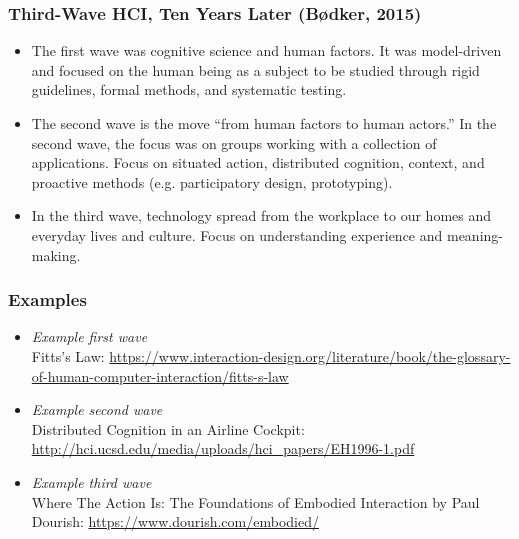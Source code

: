 \documentclass[screen, aspectratio=169]{beamer}
\begin{document}
%
\begin{frame}
\frametitle{Third-Wave HCI, Ten Years Later (B{\o}dker, 2015)}
{\small
\begin{itemize}
\item The first wave was cognitive science and human factors. It was model-driven and focused on the human being as a subject to be studied through rigid guidelines, formal methods, and systematic testing. \cite{Bodker.2015.third}
\item The second wave is the move ``from human factors to human actors.'' In the second wave, the focus was on groups working with a collection of applications. Focus on situated action, distributed cognition, context, and proactive methods (e.g. participatory design, prototyping). \cite{Bodker.2015.third}
\item  In the third wave, technology spread from the workplace to our homes and everyday lives and culture. Focus on understanding experience and meaning-making. \cite{Bodker.2015.third}
\end{itemize}
}
\end{frame}
%
\begin{frame}
\frametitle{Examples}
{\small
\begin{itemize}
\item \emph{Example first wave}\\ Fitts's Law: \url{https://www.interaction-design.org/literature/book/the-glossary-of-human-computer-interaction/fitts-s-law}
\item \emph{Example second wave}\\ Distributed Cognition in an Airline Cockpit: \url{http://hci.ucsd.edu/media/uploads/hci_papers/EH1996-1.pdf} \cite{Hutchins.Klausen.1996.distributed}
\item \emph{Example third wave}\\ Where The Action Is: The Foundations of Embodied Interaction by Paul Dourish: \url{https://www.dourish.com/embodied/} \cite{Dourish.2004.embodiedinteraction}
\end{itemize}
}
\end{frame}
\end{document}
